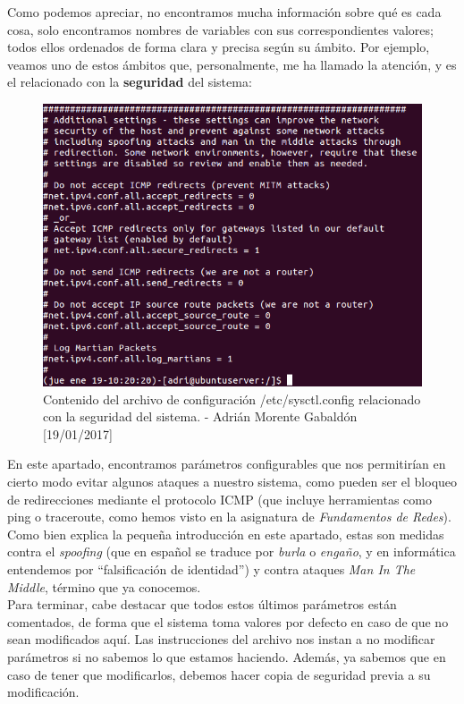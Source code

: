 Como podemos apreciar, no encontramos mucha información sobre qué es cada cosa, solo encontramos nombres de variables
con sus correspondientes valores; todos ellos ordenados de forma clara y precisa según su ámbito. Por ejemplo, veamos
uno de estos ámbitos que, personalmente, me ha llamado la atención, y es el relacionado con la \textbf{seguridad} del sistema:
\begin{figure}[H]
	\centering
	\includegraphics[scale=0.45]{sysctl-security}
	\caption{Contenido del archivo de configuración /etc/sysctl.config relacionado con la seguridad del sistema. - Adrián
	Morente Gabaldón [19/01/2017]}
	\label{figura6}
\end{figure}
En este apartado, encontramos parámetros configurables que nos permitirían en cierto modo evitar algunos ataques a nuestro
sistema, como pueden ser el bloqueo de redirecciones mediante el protocolo ICMP (que incluye herramientas como ping
o traceroute, como hemos visto en la asignatura de \emph{Fundamentos de Redes}). Como bien explica la pequeña introducción
en este apartado, estas son medidas contra el \emph{spoofing} (que en español se traduce por \emph{burla} o \emph{engaño},
y en informática entendemos por ``falsificación de identidad'') y contra ataques \emph{Man In The Middle}, término que ya
conocemos.\\
Para terminar, cabe destacar que todos estos últimos parámetros están comentados, de forma que el sistema toma valores por
defecto en caso de que no sean modificados aquí. Las instrucciones del archivo nos instan a no modificar parámetros si no
sabemos lo que estamos haciendo. Además, ya sabemos que en caso de tener que modificarlos, debemos hacer copia de seguridad
previa a su modificación.

